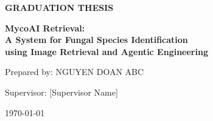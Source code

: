 \begin{titlepage}
    \centering
    \vspace*{1cm}
    {\Huge \textbf{GRADUATION THESIS} \par}
    \vspace{2cm}
    {\Large \textbf{MycoAI Retrieval: \\ A System for Fungal Species Identification \\ using Image Retrieval and Agentic Engineering} \par}
    \vspace{2cm}
    {\large Prepared by: NGUYEN DOAN ABC \par}
    \vspace{1cm}
    {\large Supervisor: [Supervisor Name] \par}
    \vfill
    {\large \today \par}
\end{titlepage}
